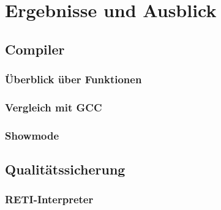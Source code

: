 
\chapter{Ergebnisse und Ausblick}
\label{ch:ergebnisse_und_ausblick}

\section{Compiler}
\subsection{Überblick über Funktionen}

\subsection{Vergleich mit GCC}

\subsection{Showmode}
%
\section{Qualitätssicherung}
\label{sec:qualitätssicherung}

\subsection{RETI-Interpreter}

